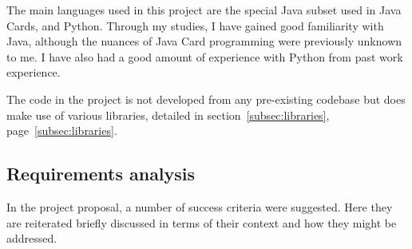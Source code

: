 \documentclass[12pt,a4paper]{article}
\begin{document}
The main languages used in this project are the special Java subset used in Java Cards, and Python. Through my studies, I have gained good familiarity with Java, although the nuances of Java Card programming were previously unknown to me. I have also had a good amount of experience with Python from past work experience.

The code in the project is not developed from any pre-existing codebase but does make use of various libraries, detailed in section~\ref{subsec:libraries}, page~\ref{subsec:libraries}.


\subsection{Requirements analysis}
\label{sec:requirements}

In the project proposal, a number of success criteria were suggested. Here they are reiterated briefly discussed in terms of their context and how they might be addressed.
\end{document}
